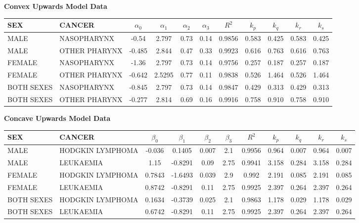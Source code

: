 \documentclass[lineno,sn-basic, Numbered]{sn-jnl}%
\theoremstyle{thmstyleone}%
\theoremstyle{thmstyletwo}%
\theoremstyle{thmstylethree}%
\begin{document}
\begin{table}[htbp]
\centering


\textbf{Convex Upwards Model Data}
\begin{tabular}{llccccccccc}
\toprule
SEX & CANCER & \(\alpha_0\) & \(\alpha_1\) & \(\alpha_2\) & \(\alpha_3\) & \(R^2\) & \(k_p\) & \(k_q\) & \(k_r\) & \(k_s\) \\
\midrule
MALE & NASOPHARYNX & -0.54 & 2.797 & 0.73 & 0.14 & 0.9856 & 0.583 & 0.425 & 0.583 & 0.425 \\
MALE & OTHER PHARYNX & -0.485 & 2.844 & 0.47 & 0.33 & 0.9923 & 0.616 & 0.763 & 0.616 & 0.763 \\
FEMALE & NASOPHARYNX & -1.36 & 2.797 & 0.73 & 0.14 & 0.9756 & 0.257 & 0.187 & 0.257 & 0.187 \\
FEMALE & OTHER PHARYNX & -0.642 & 2.5295 & 0.77 & 0.11 & 0.9838 & 0.526 & 1.464 & 0.526 & 1.464 \\
BOTH SEXES & NASOPHARYNX & -0.845 & 2.797 & 0.73 & 0.14 & 0.9847 & 0.429 & 0.313 & 0.429 & 0.313 \\
BOTH SEXES & OTHER PHARYNX & -0.277 & 2.814 & 0.69 & 0.16 & 0.9916 & 0.758 & 0.910 & 0.758 & 0.910 \\
\bottomrule
\end{tabular}

\vspace{1em} %

\textbf{Concave Upwards Model Data}
\begin{tabular}{llccccccccc}
\toprule
SEX & CANCER & \(\beta_0\) & \(\beta_1\) & \(\beta_2\) & \(\beta_3\) & \(R^2\) & \(k_p\) & \(k_q\) & \(k_r\) & \(k_s\) \\
\midrule
MALE & HODGKIN LYMPHOMA & -0.036 & 0.1405 & 0.007 & 2.1 & 0.9956 & 0.964 & 0.007 & 0.964 & 0.007 \\
MALE & LEUKAEMIA & 1.15 & -0.8291 & 0.09 & 2.75 & 0.9941 & 3.158 & 0.284 & 3.158 & 0.284 \\
FEMALE & HODGKIN LYMPHOMA & 0.7843 & -1.6493 & 0.039 & 2.9 & 0.992 & 2.191 & 0.085 & 2.191 & 0.085 \\
FEMALE & LEUKAEMIA & 0.8742 & -0.8291 & 0.11 & 2.75 & 0.9925 & 2.397 & 0.264 & 2.397 & 0.264 \\
BOTH SEXES & HODGKIN LYMPHOMA & 0.1634 & -0.3739 & 0.025 & 2.1 & 0.9863 & 1.178 & 0.029 & 1.178 & 0.029 \\
BOTH SEXES & LEUKAEMIA & 0.6742 & -0.8291 & 0.11 & 2.75 & 0.9925 & 2.397 & 0.264 & 2.397 & 0.264 \\
\bottomrule
\end{tabular}
\end{table}
\end{document}
